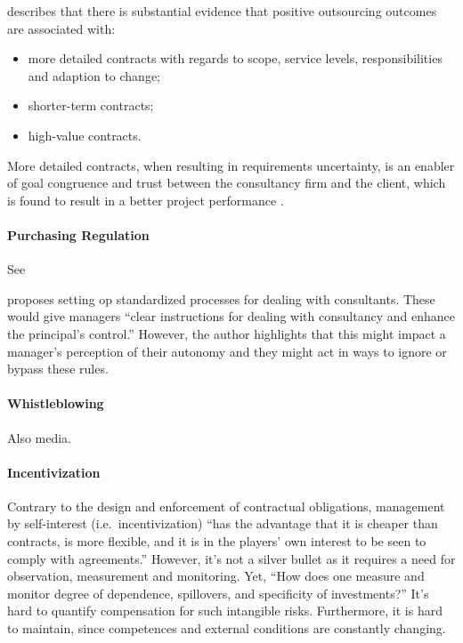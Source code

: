 \documentclass[12pt]{article}
\providecommand{\tightlist}{%
  \setlength{\itemsep}{0pt}\setlength{\parskip}{0pt}}
\begin{document}
\citet[4]{lacity2012} describes that there is substantial evidence that
positive outsourcing outcomes are associated with:

\begin{itemize}
\tightlist
\item
  more detailed contracts with regards to scope, service levels,
  responsibilities and adaption to change;
\item
  shorter-term contracts;
\item
  high-value contracts.
\end{itemize}

More detailed contracts, when resulting in requirements uncertainty, is
an enabler of goal congruence and trust between the consultancy firm and
the client, which is found to result in a better project performance
\citep[ 264]{liberatore2010}.

\hypertarget{purchasing-regulation}{%
\paragraph{Purchasing Regulation}\label{purchasing-regulation}}

See \citet[4-5]{sturdy2021}

\citet[307]{honer2006} proposes setting op standardized processes for
dealing with consultants. These would give managers ``clear instructions
for dealing with consultancy and enhance the principal's control.''
However, the author highlights that this might impact a manager's
perception of their autonomy and they might act in ways to ignore or
bypass these rules.

\hypertarget{whistleblowing}{%
\paragraph{Whistleblowing}\label{whistleblowing}}

Also media.

\hypertarget{incentivization}{%
\paragraph{Incentivization}\label{incentivization}}

Contrary to the design and enforcement of contractual obligations,
management by self-interest (i.e.~incentivization) ``has the advantage
that it is cheaper than contracts, is more flexible, and it is in the
players' own interest to be seen to comply with agreements.'' \citep[
924]{nooteboom2000} However, it's not a silver bullet as it requires a
need for observation, measurement and monitoring. Yet, ``How does one
measure and monitor degree of dependence, spillovers, and specificity of
investments?'' It's hard to quantify compensation for such intangible
risks. Furthermore, it is hard to maintain, since competences and
external conditions are constantly changing.
\end{document}

